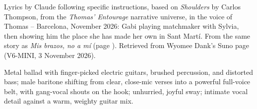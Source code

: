 
\label{sec:her-own-place}
\begin{notes}
Lyrics by Claude following specific instructions, based on \emph{Shoulders} by Carlos Thompson, from the \emph{Thomas' Entourage} narrative universe, in the voice of Thomas -- Barcelona, November 2026: Gabi playing matchmaker with Sylvia, then showing him the place she has made her own in Sant Martí. From the same story as \emph{Mis brazos, no a mí} (page \pageref{sec:mis-brazos-no-a-mi}). Retrieved from Wyomee Dank's Suno page (V6-MINI, 3 November 2026).
\end{notes}
\begin{style}
Metal ballad with finger-picked electric guitars, brushed percussion, and distorted bass; male baritone shifting from clear, close-mic verses into a powerful full-voice belt, with gang-vocal shouts on the hook; unhurried, joyful sway; intimate vocal detail against a warm, weighty guitar mix.
\end{style}
